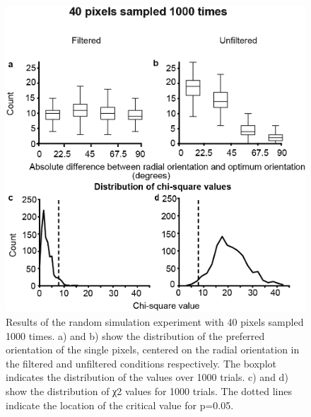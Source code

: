 				
				\begin{figure}[H]
					
					\includegraphics[width=\linewidth]{rb/FinalFigures/s3.jpg}
					\caption{Results of the random simulation experiment with 40 pixels sampled 1000 times. a) and b) show the distribution of the preferred orientation of the single pixels, centered on the radial orientation in the filtered and unfiltered conditions respectively. The boxplot indicates the distribution of the values over 1000 trials. c) and d) show the distribution of χ2 values for 1000 trials. The dotted lines indicate the location of the critical value for p=0.05.}
					\label{fig:s40}
				\end{figure}
				
